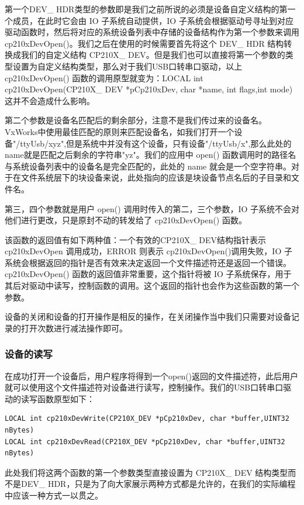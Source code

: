 	第一个DEV\_ HDR类型的参数即是我们之前所说的必须是设备自定义结构的第一个成员，在此时它会由 IO 子系统自动提供，IO 子系统会根据驱动号寻址到对应驱动函数时，然后将对应的系统设备列表中存储的设备结构作为第一个参数来调用 cp210xDevOpen()。我们之后在使用的时候需要首先将这个 DEV\_ HDR 结构转换成我们的自定义结构 CP210X\_ DEV。但是我们也可以直接将第一个参数的类型设置为自定义结构类型，那么对于我们USB口转串口驱动，以上  cp210xDevOpen() 函数的调用原型就变为：LOCAL int cp210xDevOpen(CP210X\_ DEV *pCp210xDev, char *name, int flags,int mode)这并不会造成什么影响。
		
	第二个参数是设备名匹配后的剩余部分，注意不是我们传过来的设备名。VxWorks中使用最佳匹配的原则来匹配设备名，如我们打开一个设备"/ttyUsb/xyz",但是系统中并没有这个设备，只有设备"/ttyUsb/x",那么此处的name就是匹配之后剩余的字符串"yz"。我们的应用中 open() 函数调用时的路径名与系统设备列表中的设备名是完全匹配的，此处的 name 就会是一个空字符串。对于在文件系统层下的块设备来说，此处指向的应该是块设备节点名后的子目录和文件名。

	第三，四个参数就是用户 open() 调用时传入的第二，三个参数，IO 子系统不会对他们进行更改，只是原封不动的转发给了 cp210xDevOpen() 函数。
	
	该函数的返回值有如下两种值：一个有效的CP210X\_ DEV结构指针表示 cp210xDevOpen 调用成功，ERROR 则表示 cp210xDevOpen()调用失败，IO 子系统会根据返回的指针是否有效来决定返回一个文件描述符还是返回一个错误。cp210xDevOpen() 函数的返回值非常重要，这个指针将被 IO 子系统保存，用于其后对驱动中读写，控制函数的调用。这个返回的指针也会作为这些函数的第一个参数。
	
	设备的关闭和设备的打开操作是相反的操作，在关闭操作当中我们只需要对设备记录的打开次数进行减法操作即可。

\subsubsection{设备的读写}
	在成功打开一个设备后，用户程序将得到一个open()返回的文件描述符，此后用户就可以使用这个文件描述符对设备进行读写，控制操作。我们的USB口转串口驱动的读写函数原型如下：

\lstset{language=C}
\begin{lstlisting}
LOCAL int cp210xDevWrite(CP210X_DEV *pCp210xDev, char *buffer,UINT32 nBytes)
LOCAL int cp210xDevRead(CP210X_DEV *pCp210xDev, char *buffer,UINT32 nBytes)
\end{lstlisting}

此处我们将这两个函数的第一个参数类型直接设置为 CP210X\_ DEV 结构类型而不是DEV\_ HDR，只是为了向大家展示两种方式都是允许的，在我们的实际编程中应该一种方式一以贯之。

